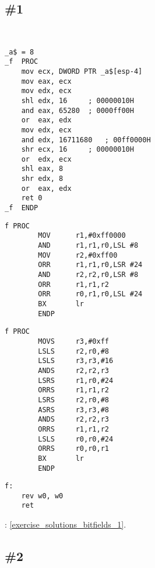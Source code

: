 \section{\Exercises}

\subsection{\Exercise \#1}
\label{exercise_bitfields_1}

\WhatThisCodeDoes\

\begin{lstlisting}[caption=\Optimizing MSVC 2010]
_a$ = 8
_f	PROC
	mov	ecx, DWORD PTR _a$[esp-4]
	mov	eax, ecx
	mov	edx, ecx
	shl	edx, 16		; 00000010H
	and	eax, 65280	; 0000ff00H
	or	eax, edx
	mov	edx, ecx
	and	edx, 16711680	; 00ff0000H
	shr	ecx, 16		; 00000010H
	or	edx, ecx
	shl	eax, 8
	shr	edx, 8
	or	eax, edx
	ret	0
_f	ENDP
\end{lstlisting}

\begin{lstlisting}[caption=\OptimizingKeilVI (\ARMMode)]
f PROC
        MOV      r1,#0xff0000
        AND      r1,r1,r0,LSL #8
        MOV      r2,#0xff00
        ORR      r1,r1,r0,LSR #24
        AND      r2,r2,r0,LSR #8
        ORR      r1,r1,r2
        ORR      r0,r1,r0,LSL #24
        BX       lr
        ENDP
\end{lstlisting}

\begin{lstlisting}[caption=\OptimizingKeilVI (\ThumbMode)]
f PROC
        MOVS     r3,#0xff
        LSLS     r2,r0,#8
        LSLS     r3,r3,#16
        ANDS     r2,r2,r3
        LSRS     r1,r0,#24
        ORRS     r1,r1,r2
        LSRS     r2,r0,#8
        ASRS     r3,r3,#8
        ANDS     r2,r2,r3
        ORRS     r1,r1,r2
        LSLS     r0,r0,#24
        ORRS     r0,r0,r1
        BX       lr
        ENDP
\end{lstlisting}

\begin{lstlisting}[caption=\Optimizing GCC 4.9 (ARM64)]
f:
	rev	w0, w0
	ret
\end{lstlisting}



\Answer{}: \ref{exercise_solutions_bitfields_1}.

\subsection{\Exercise \#2}
\label{exercise_bitfields_2}

